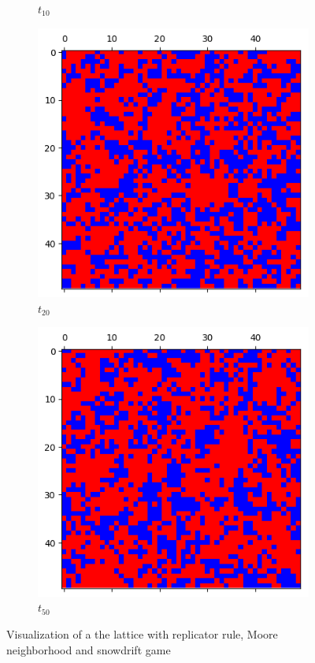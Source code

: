 \documentclass[letterpaper]{article}
\begin{document}
\begin{figure}[H]
\begin{subfigure}{.33\textwidth}
      \caption{$t_{10}$}
      \label{fig:t10_50part2}
    \end{subfigure}
    \begin{subfigure}{.33\textwidth}
      \centering
      \includegraphics[width=1\linewidth]{images/assign2/visu_50-part2/t20}
      \caption{$t_{20}$}
      \label{fig:t20_50part2}
    \end{subfigure}
    \begin{subfigure}{.33\textwidth}
      \centering
      \includegraphics[width=1\linewidth]{images/assign2/visu_50-part2/t50}
      \caption{$t_{50}$}
      \label{fig:t50_50part2}
    \end{subfigure}
    \caption{Visualization of a the lattice with replicator rule,
    Moore neighborhood and snowdrift game}
    \label{fig:visu50part2}
\end{figure}
\end{document}
